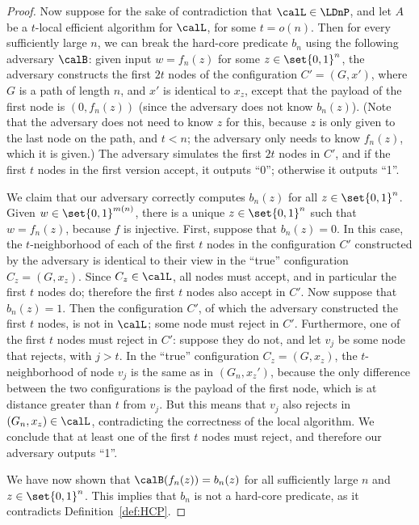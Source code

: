 \begin{proof}
	Now suppose for the sake of contradiction that $\calL \in \LDnP$,
	and let $A$ be a $t$-local efficient algorithm for $\calL$, for some $t = o(n)$.
	Then for every sufficiently large $n$, 
	we can break the hard-core predicate $b_n$ using the following adversary $\calB$:
	given input $w = f_n(z)$ for some $z \in \set{0,1}^n$,
	the adversary constructs the first $2t$ nodes of the configuration $C' = (G, x')$,
	where $G$ is a path of length $n$,
	and $x'$ is identical to $x_z$,
	except that the payload of the first node is $(0, f_n(z))$ (since the adversary does not know $b_n(z)$).
	(Note that the adversary does not need to know $z$ for this, because $z$ is only given to the last node
	on the path, and $t < n$; the adversary only needs to know $f_n(z)$, which it is given.)
	The adversary simulates the first $2t$ nodes in $C'$,
	and
	if the first $t$ nodes in the first version accept, it outputs ``0'';
	otherwise it outputs ``1''.

	We claim that our adversary correctly computes $b_n(z)$ for all $z \in \set{0,1}^n$.
	Given $w \in \set{0,1}^{m(n)}$, there is a unique $z \in \set{0,1}^n$ such that $w = f_n(z)$, because $f$ is injective.
	First, suppose that $b_n(z) = 0$. In this case, the $t$-neighborhood
	of each of the first $t$ nodes in the configuration $C'$ constructed by the adversary is identical
	to their view in the ``true'' configuration $C_z = (G, x_z)$.
	Since $C_z \in \calL$, all nodes must accept, and in particular the first $t$ nodes do;
	therefore the first $t$ nodes also accept in $C'$.
	Now suppose that $b_n(z) = 1$.
	Then the configuration $C'$,
	of which the adversary constructed the first $t$ nodes,
	is not in $\calL$; some node must reject in $C'$.
	Furthermore, one of the first $t$ nodes must reject in $C'$:
	suppose they do not, and let $v_j$ be some node that rejects, with $j > t$.
	In the ``true'' configuration $C_z = (G, x_z)$, the $t$-neighborhood of node $v_j$
	is the same as in $(G_n, x_z')$, because the only difference between the two configurations is the payload
	of the first node, which is at distance greater than $t$ from $v_j$.
	But this means that $v_j$ also rejects in $(G_n, x_z) \in \calL$, contradicting the correctness of the local algorithm.
	We conclude that at least one of the first $t$ nodes must reject, and therefore our adversary outputs ``1''.

	We have now shown that $\calB(f_n(z)) = b_n(z)$ for all sufficiently large $n$ and $z \in \set{0,1}^n$.
	This implies that $b_n$ is not a hard-core predicate, as it contradicts Definition~\ref{def:HCP}.

\end{proof}

